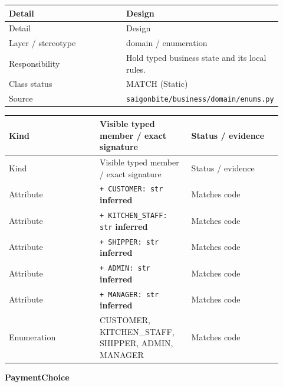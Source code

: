 \begin{longtable}{>{\raggedright\arraybackslash}p{0.4600\linewidth}>{\raggedright\arraybackslash}p{0.4600\linewidth}}
Detail & Design \\
\hline\endfirsthead
Detail & Design \\
\hline\endhead
Layer / stereotype & domain / \guillemotleft{}enumeration\guillemotright{} \\
Responsibility & Hold typed business state and its local rules. \\
Class status & MATCH (Static) \\
Source & \texttt{saigonbite/\allowbreak{}business/\allowbreak{}domain/\allowbreak{}enums.\allowbreak{}py} \\
\end{longtable}
\begin{longtable}{>{\raggedright\arraybackslash}p{0.3067\linewidth}>{\raggedright\arraybackslash}p{0.3067\linewidth}>{\raggedright\arraybackslash}p{0.3067\linewidth}}
Kind & Visible typed member / exact signature & Status / evidence \\
\hline\endfirsthead
Kind & Visible typed member / exact signature & Status / evidence \\
\hline\endhead
Attribute & \texttt{+ CUSTOMER: str} \textbf{inferred} & Matches code \\
Attribute & \texttt{+ KITCHEN\_\allowbreak{}STAFF: str} \textbf{inferred} & Matches code \\
Attribute & \texttt{+ SHIPPER: str} \textbf{inferred} & Matches code \\
Attribute & \texttt{+ ADMIN: str} \textbf{inferred} & Matches code \\
Attribute & \texttt{+ MANAGER: str} \textbf{inferred} & Matches code \\
Enumeration & CUSTOMER, KITCHEN\_STAFF, SHIPPER, ADMIN, MANAGER & Matches code \\
\end{longtable}
\textbf{PaymentChoice}

